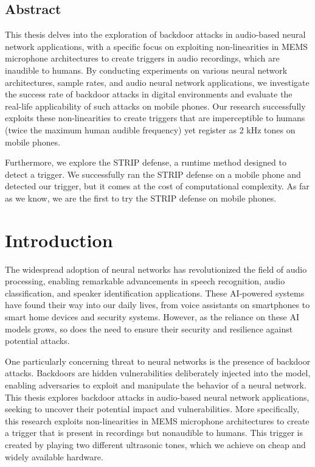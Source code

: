 \documentclass{report}
\theoremstyle{definition}
\theoremstyle{remark}
\begin{document}
\section*{Abstract}
This thesis delves into the exploration of backdoor attacks in audio-based neural network applications, with a specific focus on exploiting non-linearities in MEMS microphone architectures to create triggers in audio recordings, which are inaudible to humans. By conducting experiments on various neural network architectures, sample rates, and audio neural network applications, we investigate the success rate of backdoor attacks in digital environments and evaluate the real-life applicability of such attacks on mobile phones. Our research successfully exploits these non-linearities to create triggers that are imperceptible to humans (twice the maximum human audible frequency) yet register as 2 kHz tones on mobile phones.

Furthermore, we explore the STRIP defense, a runtime method designed to detect a trigger. We successfully ran the STRIP defense on a mobile phone and detected our trigger, but it comes at the cost of computational complexity. As far as we know, we are the first to try the STRIP defense on mobile phones. 

\newpage
\chapter{Introduction}
The widespread adoption of neural networks has revolutionized the field of audio processing, enabling remarkable advancements in speech recognition, audio classification, and speaker identification applications. These AI-powered systems have found their way into our daily lives, from voice assistants on smartphones to smart home devices and security systems. However, as the reliance on these AI models grows, so does the need to ensure their security and resilience against potential attacks.

One particularly concerning threat to neural networks is the presence of backdoor attacks. Backdoors are hidden vulnerabilities deliberately injected into the model, enabling adversaries to exploit and manipulate the behavior of a neural network. This thesis explores backdoor attacks in audio-based neural network applications, seeking to uncover their potential impact and vulnerabilities. More specifically, this research exploits non-linearities in MEMS microphone architectures to create a trigger that is present in recordings but nonaudible to humans. This trigger is created by playing two different ultrasonic tones, which we achieve on cheap and widely available hardware.
\end{document}
